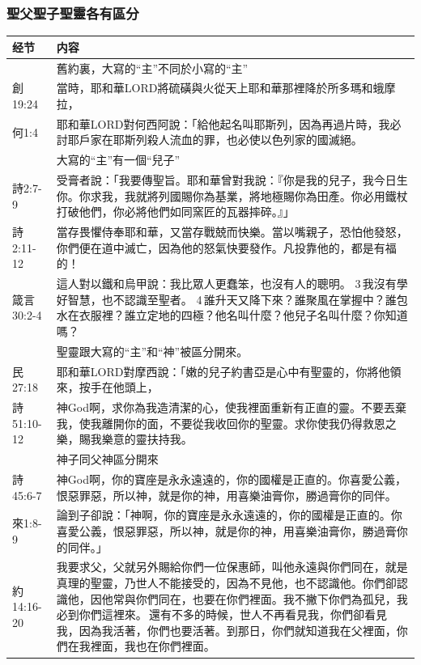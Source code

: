 \subsubsection{聖父聖子聖靈各有區分}
\begin{table}[H]
\centering
\begin{tabular}{p{5.6em}p{43em}}  \toprule
经节&内容 \\  \midrule


&舊約裏，大寫的“主”不同於小寫的“主”\\  \midrule
創19:24&當時，耶和華LORD將硫磺與火從天上耶和華那裡降於所多瑪和蛾摩拉，\\  \midrule
何1:4&耶和華LORD對何西阿說：「給他起名叫耶斯列，因為再過片時，我必討耶戶家在耶斯列殺人流血的罪，也必使以色列家的國滅絕。\\  \midrule

&大寫的“主”有一個“兒子”\\  \midrule
詩2:7-9&受膏者說：「我要傳聖旨。耶和華曾對我說：『你是我的兒子，我今日生你。你求我，我就將列國賜你為基業，將地極賜你為田產。你必用鐵杖打破他們，你必將他們如同窯匠的瓦器摔碎。』」\\  \midrule
詩2:11-12&當存畏懼侍奉耶和華，又當存戰兢而快樂。當以嘴親子，恐怕他發怒，你們便在道中滅亡，因為他的怒氣快要發作。凡投靠他的，都是有福的！\\  \midrule
箴言30:2-4&這人對以鐵和烏甲說：我比眾人更蠢笨，也沒有人的聰明。 3 我沒有學好智慧，也不認識至聖者。 4 誰升天又降下來？誰聚風在掌握中？誰包水在衣服裡？誰立定地的四極？他名叫什麼？他兒子名叫什麼？你知道嗎？\\  \midrule

&聖靈跟大寫的“主”和“神”被區分開來。\\  \midrule
民27:18&耶和華LORD對摩西說：「嫩的兒子約書亞是心中有聖靈的，你將他領來，按手在他頭上，\\  \midrule
詩51:10-12&神God啊，求你為我造清潔的心，使我裡面重新有正直的靈。不要丟棄我，使我離開你的面，不要從我收回你的聖靈。求你使我仍得救恩之樂，賜我樂意的靈扶持我。\\  \midrule

&神子同父神區分開來\\  \midrule
詩45:6-7&神God啊，你的寶座是永永遠遠的，你的國權是正直的。你喜愛公義，恨惡罪惡，所以神，就是你的神，用喜樂油膏你，勝過膏你的同伴。\\  \midrule
來1:8-9&論到子卻說：「神啊，你的寶座是永永遠遠的，你的國權是正直的。你喜愛公義，恨惡罪惡，所以神，就是你的神，用喜樂油膏你，勝過膏你的同伴。」\\  \midrule

約14:16-20&我要求父，父就另外賜給你們一位保惠師，叫他永遠與你們同在，就是真理的聖靈，乃世人不能接受的，因為不見他，也不認識他。你們卻認識他，因他常與你們同在，也要在你們裡面。我不撇下你們為孤兒，我必到你們這裡來。 還有不多的時候，世人不再看見我，你們卻看見我，因為我活著，你們也要活著。到那日，你們就知道我在父裡面，你們在我裡面，我也在你們裡面。\\  \midrule
\bottomrule
\end{tabular}%
\end{table}

